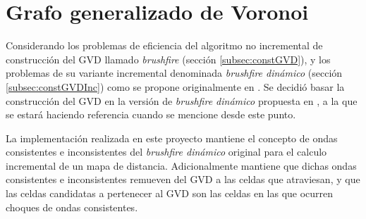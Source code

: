 






\section{Grafo generalizado de Voronoi}\label{sec:MiConstGVD}

Considerando los problemas de eficiencia del algoritmo no incremental de
construcción del GVD llamado \emph{brushfire} (sección \ref{subsec:constGVD}), y los
problemas de su variante incremental denominada \emph{brushfire dinámico} (sección
\ref{subsec:constGVDInc}) como se propone originalmente en
\cite{kalra2009incremental}. Se decidió basar la construcción del GVD en la
versión de \emph{brushfire dinámico} propuesta en \cite{Lau2013}, a la que se
estará haciendo referencia cuando se mencione  desde este punto.


La implementación realizada en este proyecto mantiene el concepto de ondas
consistentes e inconsistentes del \emph{brushfire dinámico} original para el
calculo incremental de un mapa de distancia. Adicionalmente mantiene que dichas
ondas consistentes e inconsistentes remueven del GVD a las celdas que
atraviesan, y que las celdas candidatas a pertenecer al GVD son las celdas en
las que ocurren choques de ondas consistentes.

